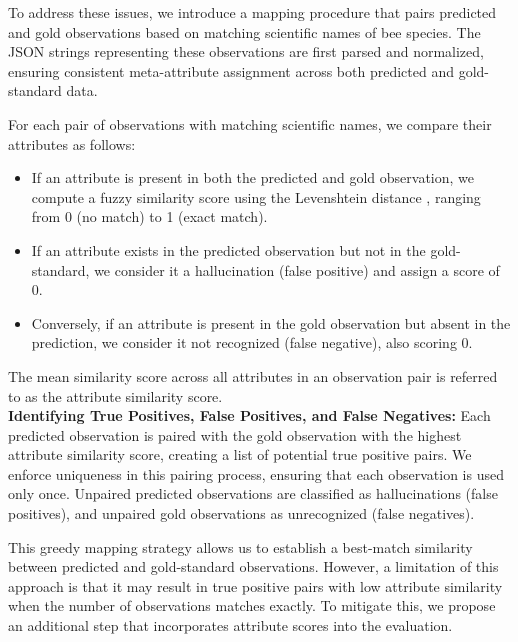 \documentclass{article}
\begin{document}
To address these issues, we introduce a mapping procedure that pairs predicted and gold observations based on matching scientific names of bee species. The JSON strings representing these observations are first parsed and normalized, ensuring consistent meta-attribute assignment across both predicted and gold-standard data.

For each pair of observations with matching scientific names, we compare their attributes as follows:

\begin{itemize}
    \item If an attribute is present in both the predicted and gold observation, we compute a fuzzy similarity score using the Levenshtein distance \cite{fuzzywuzzy2023}, ranging from 0 (no match) to 1 (exact match).
    \item If an attribute exists in the predicted observation but not in the gold-standard, we consider it a hallucination (false positive) and assign a score of 0.
    \item Conversely, if an attribute is present in the gold observation but absent in the prediction, we consider it not recognized (false negative), also scoring 0.
\end{itemize}

The mean similarity score across all attributes in an observation pair is referred to as the attribute similarity score. \\



\textbf{Identifying True Positives, False Positives, and False Negatives:} Each predicted observation is paired with the gold observation with the highest attribute similarity score, creating a list of potential true positive pairs. We enforce uniqueness in this pairing process, ensuring that each observation is used only once. Unpaired predicted observations are classified as hallucinations (false positives), and unpaired gold observations as unrecognized (false negatives).

This greedy mapping strategy allows us to establish a best-match similarity between predicted and gold-standard observations. However, a limitation of this approach is that it may result in true positive pairs with low attribute similarity when the number of observations matches exactly. To mitigate this, we propose an additional step that incorporates attribute scores into the evaluation.\\
\end{document}
